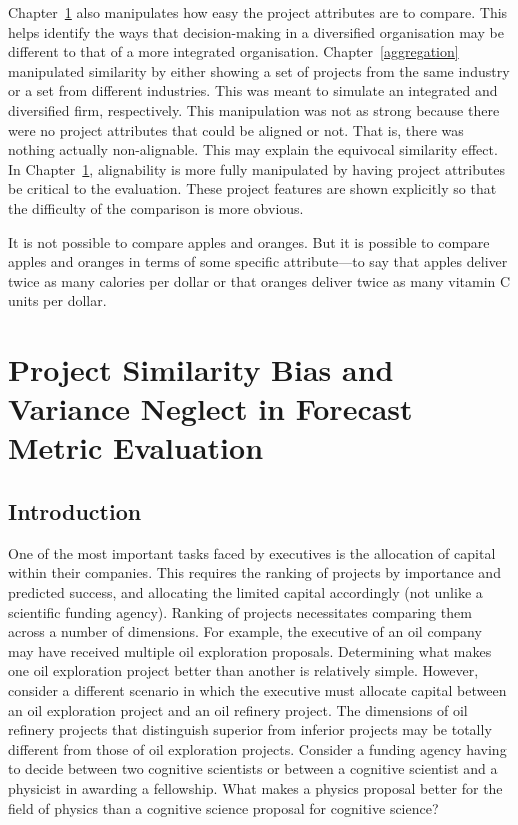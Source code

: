 \documentclass[a4paper, nobind]{templates/ociamthesis}
\theoremstyle{definition}
\theoremstyle{definition}
\theoremstyle{definition}
\theoremstyle{definition}
\theoremstyle{remark}
\begin{document}
Chapter~\ref{alignment} also manipulates how easy the project attributes are to
compare. This helps identify the ways that decision-making in a diversified
organisation may be different to that of a more integrated organisation.
Chapter~\ref{aggregation} manipulated similarity by either showing a set of
projects from the same industry or a set from different industries. This was
meant to simulate an integrated and diversified firm, respectively. This
manipulation was not as strong because there were no project attributes that
could be aligned or not. That is, there was nothing actually non-alignable. This
may explain the equivocal similarity effect. In Chapter~\ref{alignment},
alignability is more fully manipulated by having project attributes be critical
to the evaluation. These project features are shown explicitly so that the
difficulty of the comparison is more obvious.



\begin{savequote}
It is not possible to compare apples and oranges. But it is possible to
compare apples and oranges in terms of some specific attribute---to say
that apples deliver twice as many calories per dollar or that oranges
deliver twice as many vitamin C units per dollar.
\end{savequote}

\hypertarget{alignment}{%
\chapter{Project Similarity Bias and Variance Neglect in Forecast Metric Evaluation}\label{alignment}}

\minitoc

\section{Introduction}

One of the most important tasks faced by executives is the allocation of capital
within their companies. This requires the ranking of projects by importance and
predicted success, and allocating the limited capital accordingly (not unlike a
scientific funding agency). Ranking of projects necessitates comparing them
across a number of dimensions. For example, the executive of an oil company may
have received multiple oil exploration proposals. Determining what makes one oil
exploration project better than another is relatively simple. However, consider
a different scenario in which the executive must allocate capital between an oil
exploration project and an oil refinery project. The dimensions of oil refinery
projects that distinguish superior from inferior projects may be totally
different from those of oil exploration projects. Consider a funding agency
having to decide between two cognitive scientists or between a cognitive
scientist and a physicist in awarding a fellowship. What makes a physics
proposal better for the field of physics than a cognitive science proposal for
cognitive science?
\end{document}
